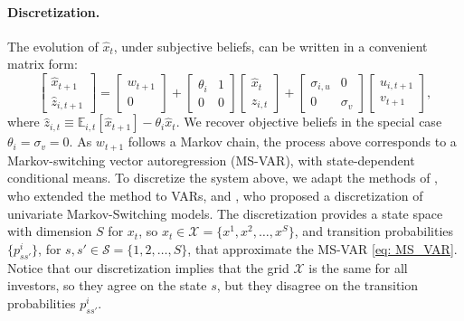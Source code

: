 \paragraph{Discretization.}
The evolution of $\hat{x}_t$, under subjective beliefs, can be written in a convenient matrix form:
\begin{equation}\label{eq: MS_VAR}
    \left[ 
    \begin{matrix}
        \hat{x}_{t+1}\\
        \hat{z}_{i,t+1}
    \end{matrix}
    \right] = \left[ \begin{matrix}
        w_{t+1}\\
        0
    \end{matrix}\right]  + \left[ \begin{matrix}
        \theta_i & 1 \\
        0 & 0
    \end{matrix} \right]
    \left[ 
    \begin{matrix}
        \hat{x}_{t}\\
        \hat{z}_{i,t}
    \end{matrix}
    \right] + \left[ \begin{matrix}
        \sigma_{i,u} & 0\\
        0 & \sigma_v
    \end{matrix} \right] \left[ 
    \begin{matrix}
        u_{i,t+1}\\
        v_{t+1}
    \end{matrix}
    \right],
\end{equation}
where $\hat{z}_{i,t} \equiv \mathbb{E}_{i,t}[\hat{x}_{t+1}] - \theta_i \hat{x}_{t}$. We recover objective beliefs in the special case $\theta_i = \sigma_v = 0$.
As $w_{t+1}$ follows a Markov chain, the process above corresponds to a Markov-switching vector autoregression (MS-VAR), with state-dependent conditional means. To discretize the system above, we adapt the methods of \citet{gospodinov2014moment}, who extended the \citet{rouwenhurst1995asset} method to VARs, and \citet{liu2017discretization}, who proposed a discretization of univariate Markov-Switching models. 
The discretization provides a state space with dimension $S$  for $x_t$, so $x_t \in \mathcal{X}= \{x^1, x^2, \ldots, x^S\}$,  and transition probabilities $\{p_{ss'}^i\}$, for $s, s' \in \mathcal{S} = \{1,2, \ldots, S\}$, that approximate the MS-VAR \eqref{eq: MS_VAR}. Notice that our discretization implies that the grid $\mathcal{X}$ is the same for all investors, so they agree on the state $s$, but they disagree on the transition probabilities $p_{ss'}^i$.



